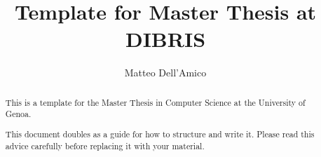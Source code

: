 \documentclass{masterthesis}
\begin{document}
\title{Template for Master Thesis at DIBRIS}

\author{Matteo Dell'Amico}



\maketitle

\begin{abstract}
This is a template for the Master Thesis in Computer Science at the University of Genoa.

This document doubles as a guide for how to structure and write it. Please read this advice carefully before replacing it with your material.
\end{abstract}

\tableofcontents













\printbibliography
% 
% 
\end{document}
